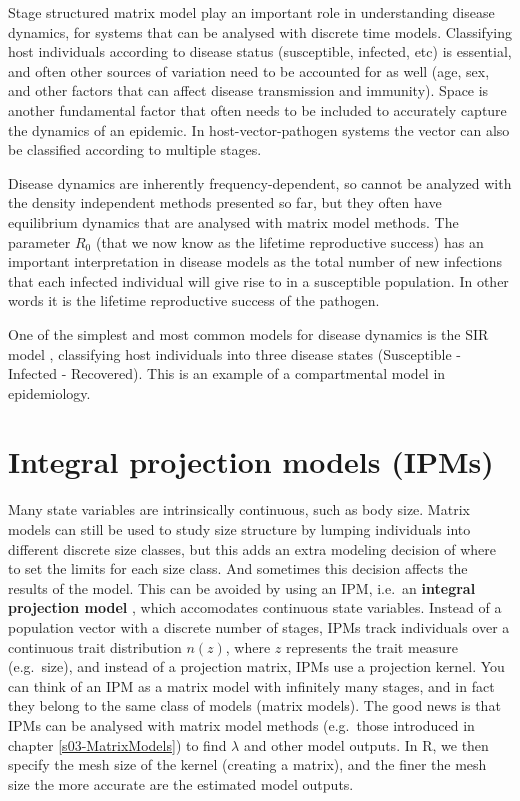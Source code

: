 \documentclass[
]{book}
\begin{document}
Stage structured matrix model play an important role in understanding disease dynamics, for systems that can be analysed with discrete time models. Classifying host individuals according to disease status (susceptible, infected, etc) is essential, and often other sources of variation need to be accounted for as well (age, sex, and other factors that can affect disease transmission and immunity). Space is another fundamental factor that often needs to be included to accurately capture the dynamics of an epidemic. In host-vector-pathogen systems the vector can also be classified according to multiple stages.

Disease dynamics are inherently frequency-dependent, so cannot be analyzed with the density independent methods presented so far, but they often have equilibrium dynamics that are analysed with matrix model methods. The parameter \(R_0\) (that we now know as the lifetime reproductive success) has an important interpretation in disease models as the total number of new infections that each infected individual will give rise to in a susceptible population. In other words it is the lifetime reproductive success of the pathogen.

One of the simplest and most common models for disease dynamics is the SIR model \citep{Kermack1}, classifying host individuals into three disease states (Susceptible - Infected - Recovered). This is an example of a compartmental model in epidemiology.

\hypertarget{integral-projection-models-ipms}{%
\section{Integral projection models (IPMs)}\label{integral-projection-models-ipms}}

Many state variables are intrinsically continuous, such as body size. Matrix models can still be used to study size structure by lumping individuals into different discrete size classes, but this adds an extra modeling decision of where to set the limits for each size class. And sometimes this decision affects the results of the model. This can be avoided by using an IPM, i.e.~an \textbf{integral projection model} \citep{Easterling1}, which accomodates continuous state variables. Instead of a population vector with a discrete number of stages, IPMs track individuals over a continuous trait distribution \(n(z)\), where \(z\) represents the trait measure (e.g.~size), and instead of a projection matrix, IPMs use a projection kernel. You can think of an IPM as a matrix model with infinitely many stages, and in fact they belong to the same class of models (matrix models). The good news is that IPMs can be analysed with matrix model methods (e.g.~those introduced in chapter \ref{s03-MatrixModels}) to find \(\lambda\) and other model outputs. In R, we then specify the mesh size of the kernel (creating a matrix), and the finer the mesh size the more accurate are the estimated model outputs.
\end{document}
